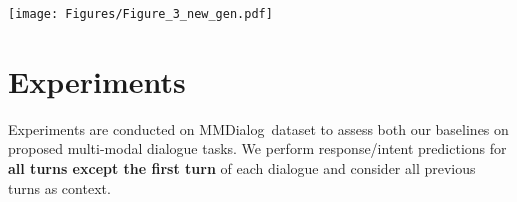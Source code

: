 \documentclass[11pt]{article}
\newcommand{\DataName}{MMDialog}
\begin{document}
\begin{table*}[ht!]
\centering
{}
\caption{Automatic evaluation results of the retrieval baselines on the test set of \DataName. All numbers except ``MM-Relevance'' are in percentage.}
\label{tab:main_ret}
\end{table*}











\begin{figure*}[bht!]
\centering  \texttt{[image: Figures/Figure\_3\_new\_gen.pdf]}
     \caption{An example of \DataName~test set. \textbf{Left}: the multi-modal dialogue context between ``A'' and ``B''. \textbf{Right}: the multi-modal responses generated or retrieved by our designed baselines.}
     \label{fig:casestudy}
\end{figure*}


\section{Experiments}
Experiments are conducted on \DataName~dataset to assess both our baselines on proposed multi-modal dialogue tasks. We perform response/intent predictions for \textbf{all turns except the first turn} of each dialogue and consider all previous turns as context. 
\end{document}
